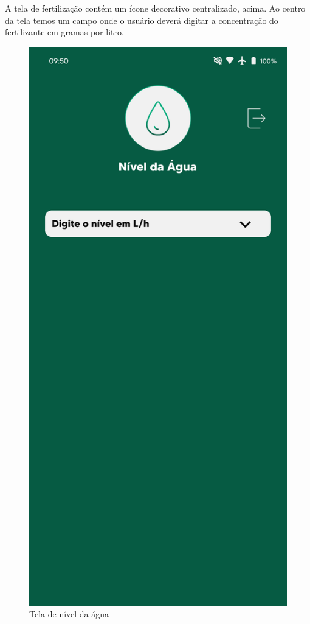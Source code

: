 A tela de fertilização contém um ícone decorativo centralizado, acima. Ao centro da tela temos um campo onde o usuário deverá digitar a concentração do fertilizante em gramas por litro.
\begin{figure}[!h]
\centering
\caption{Tela de nível da água}
\label{fig:picture10}
\includegraphics[scale=0.3]{Illustrations/Picture10.png}
\end{figure}
